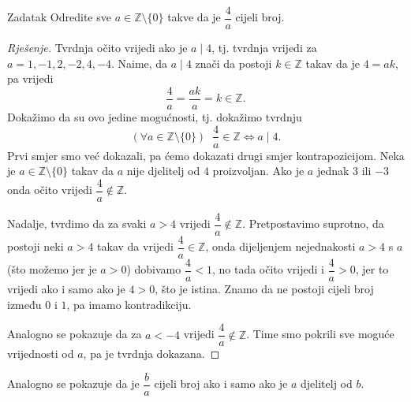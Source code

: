 \begin{exercise}{Zadatak}
Odredite sve \(a\in \mathbb{Z}\setminus \{0\}\) takve da je \(\dfrac{4}{a}\) cijeli broj.
\end{exercise}
\begin{proof}[Rješenje]
Tvrdnja očito vrijedi ako je \(a\; \vert \;4\), tj. tvrdnja vrijedi za \(a=1, -1, 2, -2, 4, -4\). Naime, da \(a\; \vert \;4\) znači da postoji \(k\in \mathbb{Z}\) takav da je \(4=ak\), pa vrijedi \[\dfrac{4}{a}=\dfrac{ak}{a}=k\in \mathbb{Z}.\]
Dokažimo da su ovo jedine mogućnosti, tj. dokažimo tvrdnju
\[\left(\forall a\in \mathbb{Z}\setminus\{0\}\right)\;\; \dfrac{4}{a}\in \mathbb{Z}\Leftrightarrow a\; \vert \; 4.\]
Prvi smjer smo već dokazali, pa ćemo dokazati drugi smjer kontrapozicijom. Neka je \(a\in \mathbb{Z}\setminus \{0\}\) takav da \(a\) nije djelitelj od \(4\) proizvoljan. Ako je \(a\) jednak \(3\) ili \(-3\) onda očito vrijedi \(\dfrac{4}{a}\notin \mathbb{Z}\).

Nadalje, tvrdimo da za svaki \(a>4\) vrijedi \(\dfrac{4}{a}\notin \mathbb{Z}\). Pretpostavimo suprotno, da postoji neki \(a>4\) takav da vrijedi \(\dfrac{4}{a}\in \mathbb{Z}\), onda dijeljenjem nejednakosti \(a>4\) s \(a\) (što možemo jer je \(a>0\)) dobivamo \(\dfrac{4}{a}<1\), no tada očito vrijedi i \(\dfrac{4}{a}>0\), jer to vrijedi ako i samo ako je \(4>0\), što je istina. Znamo da ne postoji cijeli broj između \(0\) i \(1\), pa imamo kontradikciju. 

Analogno se pokazuje da za \(a<-4\) vrijedi \(\dfrac{4}{a}\notin \mathbb{Z}\). Time smo pokrili sve moguće vrijednosti od \(a\), pa je tvrdnja dokazana.
\end{proof}
Analogno se pokazuje da je \(\dfrac{b}{a}\) cijeli broj ako i samo ako je \(a\) djelitelj od \(b\).